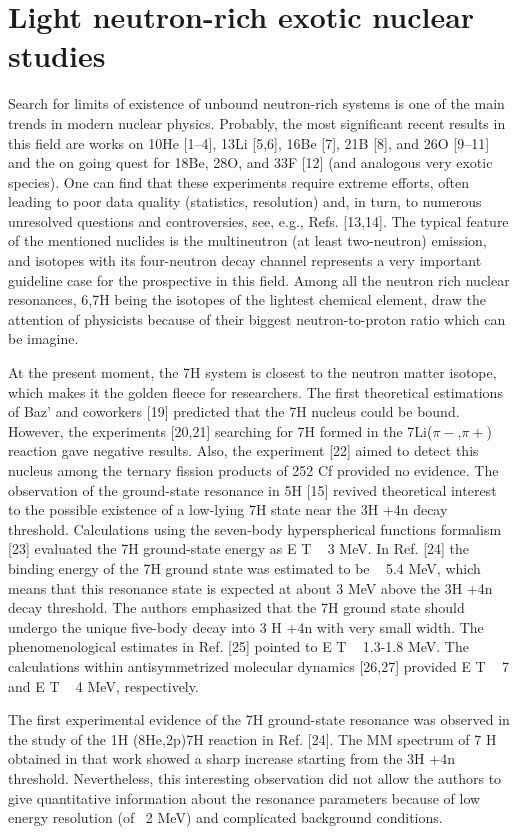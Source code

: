 \section{Light neutron-rich exotic nuclear studies}

Search for limits of existence of unbound neutron-rich systems is one of the main trends in modern nuclear physics.
Probably, the most significant recent results in this field are works on 10He [1–4], 13Li [5,6], 16Be [7], 21B [8], and 26O [9–11] and the on going quest for 18Be, 28O, and 33F [12] (and analogous very
exotic species). 
One can find that these experiments require extreme efforts, often leading to poor data quality (statistics, resolution) and, in turn, to numerous unresolved questions and controversies, see, e.g., Refs. [13,14].
The typical feature of the mentioned nuclides is the multineutron (at least two-neutron) emission, and  isotopes  with its four-neutron decay channel represents a very important guideline case for the prospective in this field.
Among all the neutron rich nuclear resonances, 6,7H being the isotopes of the lightest chemical element, draw the attention of physicists because of their biggest neutron-to-proton ratio which can be imagine.

At the present moment, the 7H system is closest to the neutron matter isotope, which makes it the golden fleece for researchers. 
The first theoretical estimations of Baz’ and coworkers [19] predicted that the 7H nucleus could be bound. 
However, the experiments [20,21] searching for 7H formed in the
7Li($\pi-$,$\pi+$) reaction gave negative results. 
Also, the experiment [22] aimed to detect this nucleus among the ternary
fission products of 252 Cf provided no evidence. 
The observation of the ground-state resonance in 5H [15] revived theoretical interest to the possible existence of a low-lying 7H state near the 3H +4n decay threshold. 
Calculations using the seven-body hyperspherical functions formalism [23] evaluated the 7H ground-state energy as E T ~ 3 MeV. 
In Ref. [24] the binding energy of the 7H ground state was estimated to be ~ 5.4 MeV, which means that this resonance state is expected at about 3 MeV above the 3H +4n decay threshold. 
The authors emphasized that the 7H ground state should undergo the unique five-body decay into 3 H +4n with very small width. 
The phenomenological estimates in Ref. [25] pointed to E T ~ 1.3-1.8 MeV. 
The calculations within antisymmetrized molecular dynamics [26,27] provided E T ~ 7 and E T ~ 4 MeV, respectively.

The first experimental evidence of the 7H ground-state resonance was observed in the study of the 1H (8He,2p)7H reaction in Ref. [24]. 
The MM spectrum of 7 H obtained in that work showed a sharp increase starting from the
3H +4n threshold. 
Nevertheless, this interesting observation did not allow the authors to give quantitative information about the resonance parameters because of low energy resolution (of ~2 MeV) and complicated background
conditions.

